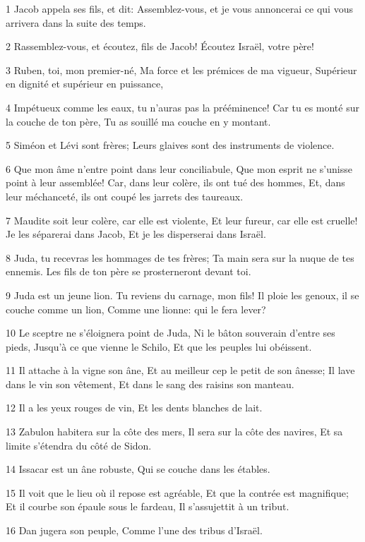 \par 1 Jacob appela ses fils, et dit: Assemblez-vous, et je vous annoncerai ce qui vous arrivera dans la suite des temps.
\par 2 Rassemblez-vous, et écoutez, fils de Jacob! Écoutez Israël, votre père!
\par 3 Ruben, toi, mon premier-né, Ma force et les prémices de ma vigueur, Supérieur en dignité et supérieur en puissance,
\par 4 Impétueux comme les eaux, tu n'auras pas la prééminence! Car tu es monté sur la couche de ton père, Tu as souillé ma couche en y montant.
\par 5 Siméon et Lévi sont frères; Leurs glaives sont des instruments de violence.
\par 6 Que mon âme n'entre point dans leur conciliabule, Que mon esprit ne s'unisse point à leur assemblée! Car, dans leur colère, ils ont tué des hommes, Et, dans leur méchanceté, ils ont coupé les jarrets des taureaux.
\par 7 Maudite soit leur colère, car elle est violente, Et leur fureur, car elle est cruelle! Je les séparerai dans Jacob, Et je les disperserai dans Israël.
\par 8 Juda, tu recevras les hommages de tes frères; Ta main sera sur la nuque de tes ennemis. Les fils de ton père se prosterneront devant toi.
\par 9 Juda est un jeune lion. Tu reviens du carnage, mon fils! Il ploie les genoux, il se couche comme un lion, Comme une lionne: qui le fera lever?
\par 10 Le sceptre ne s'éloignera point de Juda, Ni le bâton souverain d'entre ses pieds, Jusqu'à ce que vienne le Schilo, Et que les peuples lui obéissent.
\par 11 Il attache à la vigne son âne, Et au meilleur cep le petit de son ânesse; Il lave dans le vin son vêtement, Et dans le sang des raisins son manteau.
\par 12 Il a les yeux rouges de vin, Et les dents blanches de lait.
\par 13 Zabulon habitera sur la côte des mers, Il sera sur la côte des navires, Et sa limite s'étendra du côté de Sidon.
\par 14 Issacar est un âne robuste, Qui se couche dans les étables.
\par 15 Il voit que le lieu où il repose est agréable, Et que la contrée est magnifique; Et il courbe son épaule sous le fardeau, Il s'assujettit à un tribut.
\par 16 Dan jugera son peuple, Comme l'une des tribus d'Israël.
